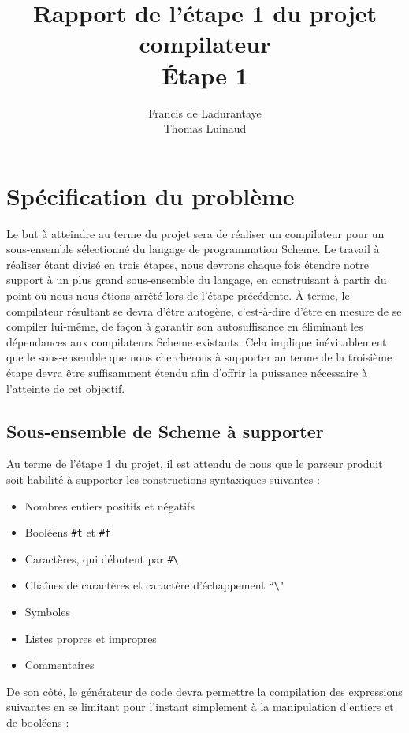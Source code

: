 \documentclass[12pt]{article}
\title{Rapport de l'étape 1 du projet compilateur \\ Étape 1}
\author{Francis de Ladurantaye \\ Thomas Luinaud}
\begin{document}
\begin{titlepage}
  \maketitle
\end{titlepage}


\section{Spécification du problème}
Le but à atteindre au terme du projet sera de réaliser un compilateur pour un sous-ensemble sélectionné du langage de programmation Scheme. Le travail à réaliser étant divisé en trois étapes, nous devrons chaque fois étendre notre support à un plus grand sous-ensemble du langage, en construisant à partir du point où nous nous étions arrêté lors de l'étape précédente. À terme, le compilateur résultant se devra d'être autogène, c'est-à-dire d'être en mesure de se compiler lui-même, de façon à garantir son autosuffisance en éliminant les dépendances aux compilateurs Scheme existants. Cela implique inévitablement que le sous-ensemble que nous chercherons à supporter au terme de la troisième étape devra être suffisamment étendu afin d'offrir la puissance nécessaire à l'atteinte de cet objectif.

\subsection{Sous-ensemble de Scheme à supporter}
Au terme de l'étape 1 du projet, il est attendu de nous que le parseur produit soit habilité à supporter les constructions syntaxiques suivantes :

\begin{itemize}
\item Nombres entiers positifs et négatifs
\item Booléens \texttt{\#t} et \texttt{\#f}
\item Caractères, qui débutent par \texttt{\#\textbackslash}
\item Chaînes de caractères et caractère d'échappement ``\texttt{\textbackslash}"
\item Symboles
\item Listes propres et impropres
\item Commentaires
\end{itemize}

De son côté, le générateur de code devra permettre la compilation des expressions suivantes en se limitant pour l'instant simplement à la manipulation d'entiers et de booléens :
\end{document}
